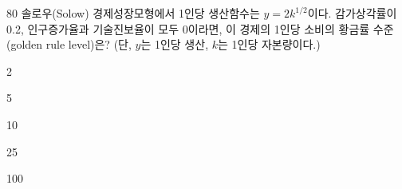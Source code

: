 \begin{question}{80}
솔로우(Solow) 경제성장모형에서 1인당 생산함수는 $y = 2k^{1/2}$이다. 감가상각률이 0.2, 인구증가율과 기술진보율이 모두 0이라면, 이 경제의 1인당 소비의 황금률 수준(golden rule level)은? (단, $y$는 1인당 생산, $k$는 1인당 자본량이다.)
\begin{choices}
  \item 2
  \item 5
  \item 10
  \item 25
  \item 100
\end{choices}
\end{question}
